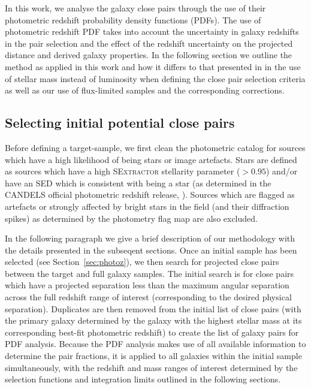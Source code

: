 
In this work, we analyse the galaxy close pairs through the use of their photometric redshift probability density functions (PDFs). The use of photometric redshift PDF takes into account the uncertainty in galaxy redshifts in the pair selection and the effect of the redshift uncertainty on the projected distance and derived galaxy properties. In the following section we outline the method as applied in this work and how it differs to that presented in  in the use of stellar mass instead of luminosity when defining the close pair selection criteria as well as our use of flux-limited samples and the corresponding corrections.

\subsection{Selecting initial potential close pairs}\label{sec:initial}
Before defining a target-sample, we first clean the photometric catalog for sources which have a high likelihood of being stars or image artefacts. Stars are defined as sources which have a high \textsc{SExtractor} stellarity parameter ($> 0.95$) and/or have an SED which is consistent with being a star (as determined in the CANDELS official photometric redshift release, \citet{Dahlen:2013eu}). Sources which are flagged as artefacts or strongly affected by bright stars in the field (and their diffraction spikes) as determined by the photometry flag map \citep{Guo:2013ig} are also excluded.

In the following paragraph we give a brief description of our methodology with the details presented in the subseqent sections. Once an initial sample has been selected (see Section~\ref{sec:photoz}), we then search for projected close pairs between the target and full galaxy samples. The initial search is for close pairs which have a projected separation less than the maximum angular separation across the full redshift range of interest (corresponding to the desired physical separation). Duplicates are then removed from the initial list of close pairs (with the primary galaxy determined by the galaxy with the highest stellar mass at its corresponding best-fit photometric redshift) to create the list of galaxy pairs for PDF analysis. Because the PDF analysis makes use of all available information to determine the pair fractions, it is applied to all galaxies within the initial sample simultaneously, with the redshift and mass ranges of interest determined by the selection functions and integration limits outlined in the following sections.

